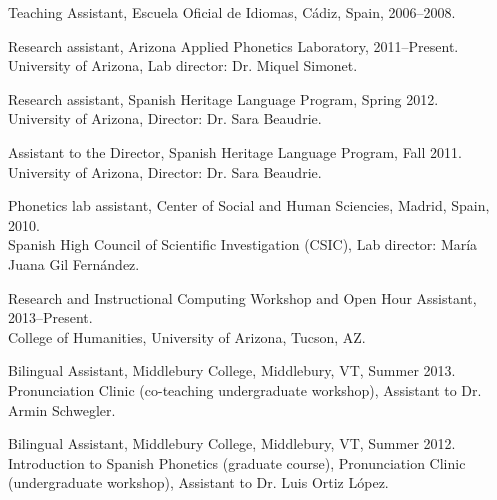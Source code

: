 \documentclass[11pt]{article}
\begin{document}
\noindent Teaching Assistant, Escuela Oficial de Idiomas, Cádiz, Spain, 2006--2008.


\bigskip
 

\medskip
\noindent Research assistant, Arizona Applied Phonetics Laboratory, 2011--Present. \\ 
University of Arizona, Lab director: Dr. Miquel Simonet. \\ \vspace{-0.1in}

\noindent Research assistant, Spanish Heritage Language Program, Spring 2012. \\ 
University of Arizona, Director: Dr. Sara Beaudrie. \\ \vspace{-0.1in}

\noindent Assistant to the Director, Spanish Heritage Language Program, Fall 2011. \\
University of Arizona, Director: Dr. Sara Beaudrie. \\ \vspace{-0.1in}

\noindent Phonetics lab assistant, Center of Social and Human Sciencies, Madrid, Spain, 2010. \\ 
Spanish High Council of Scientific Investigation (CSIC), Lab director: María Juana Gil Fernández.


\clearpage

\medskip
\noindent Research and Instructional Computing Workshop and Open Hour Assistant, 2013--Present. \\
College of Humanities, University of Arizona, Tucson, AZ. \\ \vspace{-0.1in}

\noindent Bilingual Assistant, Middlebury College, Middlebury, VT, Summer 2013. \\
Pronunciation Clinic (co-teaching undergraduate workshop), Assistant to Dr. Armin Schwegler. \\ \vspace{-0.1in}

\noindent Bilingual Assistant, Middlebury College, Middlebury, VT, Summer 2012. \\
Introduction to Spanish Phonetics (graduate course), Pronunciation Clinic (undergraduate workshop), Assistant to Dr. Luis Ortiz López. \\ \vspace{-0.1in}
\end{document}
